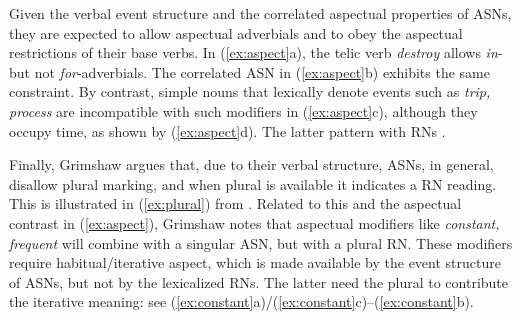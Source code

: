 \documentclass[output=paper]{langsci/langscibook}
\begin{document}
\begin{exe}
\end{exe}

 {Given the verbal event structure and the correlated aspectual properties of ASNs, they are expected to allow aspectual adverbials and to obey the aspectual restrictions of their base verbs. In (\ref{ex:aspect}a), the telic verb \textit{destroy} allows \textit{in}- but not \textit{for}-adverbials. The correlated ASN in (\ref{ex:aspect}b) exhibits the same constraint. By contrast,  simple nouns that lexically denote events such as \textit{trip, process} are incompatible with such modifiers in (\ref{ex:aspect}c), although they occupy time, as shown by (\ref{ex:aspect}d). The latter pattern with RNs \parencite[58--59]{grimshaw:90}.}

\begin{exe}
\end{exe}

 {Finally, Grimshaw argues that, due to their verbal structure, ASNs, in general, disallow plural marking, and when plural is available it indicates a RN reading. This is illustrated in (\ref{ex:plural}) from \citet[54]{grimshaw:90}. Related to this and the aspectual contrast in (\ref{ex:aspect}), Grimshaw notes that aspectual modifiers like \textit{constant, frequent} will combine with a singular ASN, but with a plural RN. These modifiers require habitual/iterative aspect, which is made available by the event structure of ASNs, but not by the lexicalized RNs. The latter need the plural to contribute the iterative meaning: see (\ref{ex:constant}a)/(\ref{ex:constant}c)--(\ref{ex:constant}b).}

\begin{exe}
\end{exe}
\end{document}
